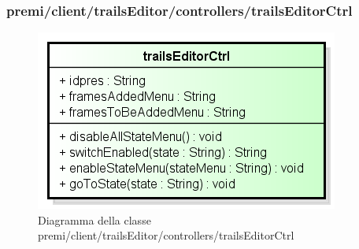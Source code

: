 \subsubsection{premi/client/trailsEditor/controllers/trailsEditorCtrl}
\begin{figure}[h]
\begin{center}
\includegraphics[scale=0.55]{img/diacla/trailsEditorCtrl.png}
\caption{Diagramma della classe premi/client/trailsEditor/controllers/trailsEditorCtrl}
\end{center}
\end{figure}


